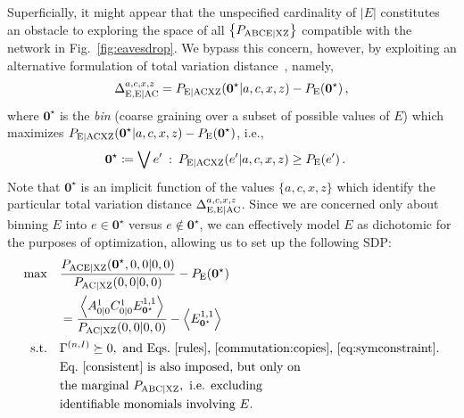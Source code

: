 \documentclass[superscriptaddress,aps,prx,nofootinbib,twocolumn,twoside,reprint,letterpaper,longbibliography]{revtex4-2}
\DeclarePairedDelimiter{\expec}{\langle}{\rangle}
\begin{document}
Superficially, it might appear that the unspecified cardinality of $|E|$ constitutes an obstacle to exploring the space of all $\left\{P_\text{ABCE{\textbar}XZ}\right\}$ compatible with the network in Fig.~\ref{fig:eavesdrop}. We bypass this concern, however, by exploiting an alternative formulation of total variation distance~\cite{Levin2017}, namely,
\begin{align}\begin{split}
\Delta_{\text{E},\text{E{\textbar}AC}}^{a,c,x,z}&= P_{\text{E{\textbar}ACXZ}}({\boldsymbol{0}}^\star|a,c,x,z)-P_{\text{E}}({\boldsymbol{0}}^\star)\,,\\
\end{split}\end{align}
where ${\boldsymbol{0}}^\star$ is the \emph{bin} (coarse graining over a subset of possible values of $E$) which maximizes \mbox{$P_{\text{E{\textbar}ACXZ}}({\boldsymbol{0}}^\star|a,c,x,z)-P_{\text{E}}({\boldsymbol{0}}^\star)$}, i.e.,
\begin{align}\begin{split}
{\boldsymbol{0}}^\star &\coloneqq \bigvee e'\: : \:P_{\text{E{\textbar}ACXZ}}(e'|a,c,x,z)\geq P_{\text{E}}(e')\,.
\end{split}\end{align}
Note that ${\boldsymbol{0}}^\star$ is an implicit function of the values $\{a,c,x,z\}$ which identify the particular total variation distance $\Delta_{\text{E},\text{E{\textbar}AC}}^{a,c,x,z}$.
Since we are concerned only about binning $E$ into $e\in {\boldsymbol{0}}^\star$ versus $e\notin {\boldsymbol{0}}^\star$, we can effectively model $E$ as dichotomic for the purposes of optimization, allowing us to set up the following SDP:
\begin{align}\begin{split}\label{eq:cryptoSDP}
    \max \quad & \frac{P_{\text{ACE{\textbar}XZ}}({\boldsymbol{0}}^\star,0,0|0,0)}{P_{\text{AC{\textbar}XZ}}(0,0|0,0)}-P_{\text{E}}({\boldsymbol{0}}^\star)
    \\&=\frac{\expec*{A^{1}_{0|0}C^{1}_{0|0}E^{1,1}_{{\boldsymbol{0}}^\star}}}{P_{\text{AC{\textbar}XZ}}(0,0|0,0)}-\expec*{E^{1,1}_{{\boldsymbol{0}}^\star}} \\
    \text{s.t.} \quad & \Gamma^{(n,I)}\succeq 0, \text{ and Eqs.~\eqref{rules}, \eqref{commutation:copies}, \eqref{eq:symconstraint}.}\\
    &\text{Eq.~\eqref{consistent} is also imposed, but only on}
    \\&\text{the marginal }P_{\text{ABC{\textbar}XZ}},\text{ i.e. excluding}
    \\&\text{identifiable monomials involving \(E\).}
\end{split}\end{align}
\end{document}

